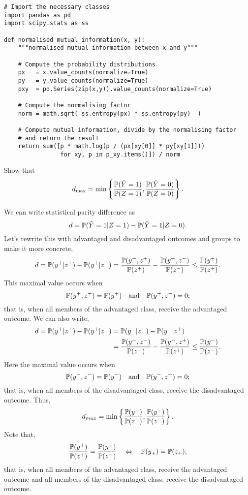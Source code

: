 \begin{lstlisting}[caption={Calculating the normalised prejudice index}, label=clt_Ex-npi]
# Import the necessary classes
import pandas as pd
import scipy.stats as ss

def normalised_mutual_information(x, y):
    """normalised mutual information between x and y"""
    
    # Compute the probability distributions
    px   = x.value_counts(normalize=True)
    py   = y.value_counts(normalize=True)
    pxy  = pd.Series(zip(x,y)).value_counts(normalize=True)
    
    # Compute the normalising factor
    norm = math.sqrt( ss.entropy(px) * ss.entropy(py)  )
    
    # Compute mutual information, divide by the normalising factor
    # and return the result
    return sum([p * math.log(p / (px[xy[0]] * py[xy[1]]))
                for xy, p in p_xy.items()]) / norm
\end{lstlisting}

\begin{lookbox}
 Show that \[
d_{\max} = \min\left\{ \frac{\mathbb{P}(\hat{Y}=1)}{\mathbb{P}(Z=1)},
                       \frac{\mathbb{P}(\hat{Y}=0)}{\mathbb{P}(Z=0)} \right\}.
\]
\end{lookbox}

We can write statistical parity difference as
\[
d = \mathbb{P}(\hat{Y}=1 | Z=1) - \mathbb{P}(\hat{Y}=1 | Z=0).
\]
Let's rewrite this with advantaged and disadvantaged outcomes and groups to make it more concrete,
\[
d = \mathbb{P}(y^+|z^+) - \mathbb{P}(y^+|z^-) \\
  = \frac{\mathbb{P}(y^+, z^+)}{\mathbb{P}(z^+)} - \frac{\mathbb{P}(y^+, z^-)}{\mathbb{P}(z^-)}
  \leq \frac{\mathbb{P}(y^+)}{\mathbb{P}(z^+)}.
\]
This maximal value occurs when 
\[
\mathbb{P}(y^+, z^+) = \mathbb{P}(y^+) \quad \text{and} \quad \mathbb{P}(y^+, z^-)=0;
\]
that is, when all members of the advantaged class, receive the advantaged outcome. We can also write,
\begin{align*}
d = \mathbb{P}(y^+|z^+) - \mathbb{P}(y^+|z^-) 
  & = \mathbb{P}(y^-|z^-) - \mathbb{P}(y^-|z^+) \\
  & = \frac{\mathbb{P}(y^-, z^-)}{\mathbb{P}(z^-)}
    - \frac{\mathbb{P}(y^-, z^+)}{\mathbb{P}(z^+)} \leq \frac{\mathbb{P}(y^-)}{\mathbb{P}(z^-)}.
\end{align*}
Here the maximal value occurs when 
\[
\mathbb{P}(y^-, z^-) = \mathbb{P}(y^-) \quad \text{and} \quad \mathbb{P}(y^-, z^+)=0;
\]
that is, when all members of the disadvantaged class, receive the disadvantaged outcome. Thus,
\[
d_{max} = \min\left\{ \frac{\mathbb{P}(y^+)}{\mathbb{P}(z^+)},
                      \frac{\mathbb{P}(y^-)}{\mathbb{P}(z^-)} \right\}.
\]
Note that,
\[
\frac{\mathbb{P}(y^+)}{\mathbb{P}(z^+)} = \frac{\mathbb{P}(y^-)}{\mathbb{P}(z^-)} \quad \Leftrightarrow \quad \mathbb{P}(y_+) = \mathbb{P}(z_+);
\]
that is, when all members of the advantaged class, receive the advantaged outcome and all members of the disadvantaged class, receive the disadvantaged outcome.

